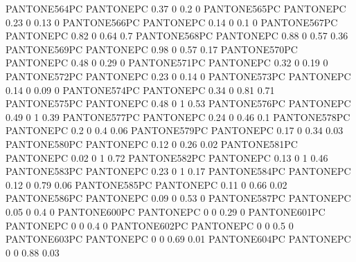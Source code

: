  {PANTONE564PC} {PANTONE\SpotSpace PC} {0.37 0 0.2 0}
 {PANTONE565PC} {PANTONE\SpotSpace PC} {0.23 0 0.13 0}
 {PANTONE566PC} {PANTONE\SpotSpace PC} {0.14 0 0.1 0}
 {PANTONE567PC} {PANTONE\SpotSpace PC} {0.82 0 0.64 0.7}
 {PANTONE568PC} {PANTONE\SpotSpace PC} {0.88 0 0.57 0.36}
 {PANTONE569PC} {PANTONE\SpotSpace PC} {0.98 0 0.57 0.17}
 {PANTONE570PC} {PANTONE\SpotSpace PC} {0.48 0 0.29 0}
 {PANTONE571PC} {PANTONE\SpotSpace PC} {0.32 0 0.19 0}
 {PANTONE572PC} {PANTONE\SpotSpace PC} {0.23 0 0.14 0}
 {PANTONE573PC} {PANTONE\SpotSpace PC} {0.14 0 0.09 0}
 {PANTONE574PC} {PANTONE\SpotSpace PC} {0.34 0 0.81 0.71}
 {PANTONE575PC} {PANTONE\SpotSpace PC} {0.48 0 1 0.53}
 {PANTONE576PC} {PANTONE\SpotSpace PC} {0.49 0 1 0.39}
 {PANTONE577PC} {PANTONE\SpotSpace PC} {0.24 0 0.46 0.1}
 {PANTONE578PC} {PANTONE\SpotSpace PC} {0.2 0 0.4 0.06}
 {PANTONE579PC} {PANTONE\SpotSpace PC} {0.17 0 0.34 0.03}
 {PANTONE580PC} {PANTONE\SpotSpace PC} {0.12 0 0.26 0.02}
 {PANTONE581PC} {PANTONE\SpotSpace PC} {0.02 0 1 0.72}
 {PANTONE582PC} {PANTONE\SpotSpace PC} {0.13 0 1 0.46}
 {PANTONE583PC} {PANTONE\SpotSpace PC} {0.23 0 1 0.17}
 {PANTONE584PC} {PANTONE\SpotSpace PC} {0.12 0 0.79 0.06}
 {PANTONE585PC} {PANTONE\SpotSpace PC} {0.11 0 0.66 0.02}
 {PANTONE586PC} {PANTONE\SpotSpace PC} {0.09 0 0.53 0}
 {PANTONE587PC} {PANTONE\SpotSpace PC} {0.05 0 0.4 0}
 {PANTONE600PC} {PANTONE\SpotSpace PC} {0 0 0.29 0}
 {PANTONE601PC} {PANTONE\SpotSpace PC} {0 0 0.4 0}
 {PANTONE602PC} {PANTONE\SpotSpace PC} {0 0 0.5 0}
 {PANTONE603PC} {PANTONE\SpotSpace PC} {0 0 0.69 0.01}
 {PANTONE604PC} {PANTONE\SpotSpace PC} {0 0 0.88 0.03}
